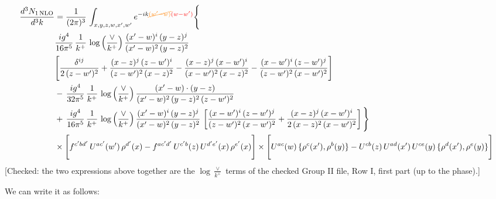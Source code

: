 \documentclass[9pt]{article}
\numberwithin{equation}{section}
\begin{document}
\begin{align}
\frac{d^{3}N_{1\,\rm NLO}}{d^{3}k} & =  \frac{1}{(2\pi)^{3}}\,\int_{x,y,z,w,x',w^{\prime}} e^{-ik{\color{orange}\cancel{(w^{\prime}-w)}}{\color{red}(w-w^{\prime})}}\Bigg\{\notag \\
&  \frac{ig^{4}}{16\pi^{5}}\,\frac{1}{k^{+}}\,\log{\left(\frac{\vee}{k^{+}}\right)}\, \frac{(x'-w)^{i}\,(y-z)^{j}}{(x'-w)^{2}\,(y-z)^{2}}\notag \\ &  \Bigg[\frac{\delta^{ij}}{2\,(z-w')^{2}}+\frac{(x-z)^{j}\,(z-w')^{i}}{(z-w')^{2}\,(x-z)^{2}}-\frac{(x-z)^{j}\,(x-w')^{i}}{(x-w')^{2}\,(x-z)^{2}}-\frac{(x-w')^{i}\,(z-w')^{j}}{(z-w')^{2}\,(x-w')^{2}}\Bigg] \notag \\
& -\,\frac{ig^{4}}{32\pi^{5}}\,\frac{1}{k^{+}}\,\log{\left(\frac{\vee}{k^{+}}\right)}\, \frac{(x'-w)\cdot (y-z)}{(x'-w)^{2}\,(y-z)^{2}\,(z-w')^{2}} \notag \\
& +\,\frac{ig^{4}}{16\pi^{5}}\,\frac{1}{k^{+}}\,\log{\left(\frac{\vee}{k^{+}}\right)}\,\frac{(x'-w)^{i}\,(y-z)^{j}}{(x'-w)^{2}\,(y-z)^{2}}\,\left[\frac{(x-w')^{i}\,(z-w')^{j}}{(z-w')^{2}\,(x-w')^{2}}+\frac{(x-z)^{j}\,(x-w')^{i}}{2\,(x-z)^{2}\, (x-w')^{2}}\right]\Bigg\} \notag \\ & \times\Bigg[f^{c'bd'}\,U^{ac'}(w')\,\rho^{d'}(x)-f^{ac'd'}\, U^{c'b}(z)\,U^{d'e'}(x)\,\rho^{e'}(x)\Bigg] \times \Bigg[U^{ac}(w)\,\{\rho^{c}(x'),\rho^{b}(y)\}-U^{cb}(z)\,U^{ad}(x')\,U^{ce}(y)\, \{\rho^{d}(x'),\rho^{e}(y)\}\Bigg]
    \end{align} {\color{red}[Checked: the two expressions above together are the $\log\frac{\vee}{k^{+}}$ terms of the checked Group II file, Row I, first part (up to the phase).]}\par\noindent 
We can write it as follows:
\end{document}
